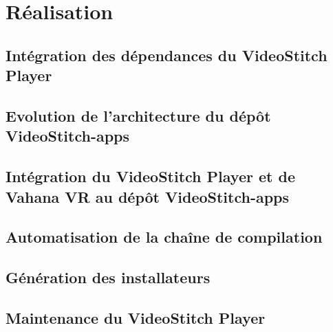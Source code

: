 \section{Réalisation}
\subsection{Intégration des dépendances du VideoStitch Player}

\subsection{Evolution de l'architecture du dépôt VideoStitch-apps}

\subsection{Intégration du VideoStitch Player et de Vahana VR au dépôt VideoStitch-apps}

\subsection{Automatisation de la chaîne de compilation}

\subsection{Génération des installateurs}

\subsection{Maintenance du VideoStitch Player}
